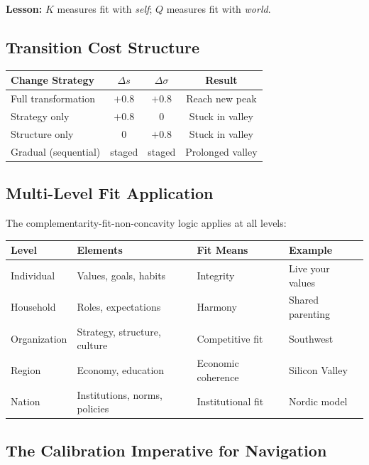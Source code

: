 \textbf{Lesson:} $K$ measures fit with \textit{self}; $Q$ measures fit with \textit{world}.

\subsection{Transition Cost Structure}

\begin{center}
\renewcommand{\arraystretch}{1.2}
\begin{tabular}{@{}lccc@{}}
\toprule
\textbf{Change Strategy} & $\Delta s$ & $\Delta \sigma$ & \textbf{Result} \\
\midrule
Full transformation & $+0.8$ & $+0.8$ & Reach new peak \\
Strategy only & $+0.8$ & $0$ & Stuck in valley \\
Structure only & $0$ & $+0.8$ & Stuck in valley \\
Gradual (sequential) & staged & staged & Prolonged valley \\
\bottomrule
\end{tabular}
\end{center}

\subsection{Multi-Level Fit Application}

The complementarity-fit-non-concavity logic applies at all levels:

\begin{center}
\renewcommand{\arraystretch}{1.2}
\small
\begin{tabular}{@{}llll@{}}
\toprule
\textbf{Level} & \textbf{Elements} & \textbf{Fit Means} & \textbf{Example} \\
\midrule
Individual & Values, goals, habits & Integrity & Live your values \\
Household & Roles, expectations & Harmony & Shared parenting \\
Organization & Strategy, structure, culture & Competitive fit & Southwest \\
Region & Economy, education & Economic coherence & Silicon Valley \\
Nation & Institutions, norms, policies & Institutional fit & Nordic model \\
\bottomrule
\end{tabular}
\end{center}

\subsection{The Calibration Imperative for Navigation}

